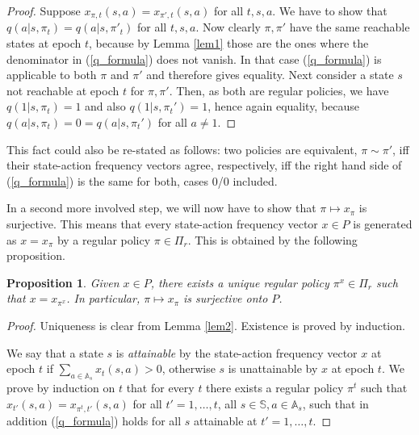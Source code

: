 \documentclass{article}
\newtheorem{proposition}[theorem]{Proposition}
\theoremstyle{definition}
\newcounter{step}[algorithm]
\numberwithin{equation}{section}
\begin{document}
{\begin{proof}
    Suppose $x_{\pi,t}(s,a) = x_{\pi',t}(s,a)$ for all $t,s,a$. We have to show that 
    $q(a|s,\pi_t) = q(a|s,\pi'_t)$ for all $t,s,a$. Now clearly $\pi,\pi'$ have the same reachable states
    at epoch $t$,
    because by Lemma \ref{lem1} those are the ones where the denominator in (\ref{q_formula}) does not vanish. In that case (\ref{q_formula}) is applicable to both $\pi$ and $\pi'$ and 
    therefore gives equality. Next consider a state $s$ not reachable at epoch $t$ for
    $\pi,\pi'$. Then, as both are regular policies, we have
    $q(1|s,\pi_t)=1$ and also $q(1|s,\pi_t')=1$, hence again equality, because
    $q(a|s,\pi_t) = 0 =  q(a|s,\pi_t')$ for all $a\not=1$.
\end{proof}

This fact could also be re-stated as follows: two policies are equivalent, $\pi \sim \pi'$,
iff their state-action frequency vectors agree, respectively, iff the right hand side of (\ref{q_formula}) is the same for both, cases 0/0 included. 






In a second more involved step, we will now have to show that
$\pi \mapsto x_\pi$ is surjective. This means that
every state-action frequency vector  $x \in P$ is  generated 
as $x=x_\pi$ by a regular policy $\pi\in \Pi_r$. 
This is obtained by the following proposition.



\begin{proposition}
\label{prop2}
%
Given $x \in  P$,  there exists a unique regular policy $\pi^x \in \Pi_r$ such that $x = x_{\pi^x}$. In particular, $\pi \mapsto x_\pi$ is surjective 
onto $P$.
\end{proposition}

\begin{proof}
Uniqueness is clear from Lemma \ref{lem2}. Existence is
proved by induction.

We say that a state $s$ is \textit{attainable} by the state-action frequency vector $x$
at epoch $t$ if $\sum_{a\in \mathbb{A}_s} x_t(s,a) > 0$, otherwise $s$ is unattainable by $x$ at epoch $t$. We prove
by induction on $t$ that for every $t$ there exists a regular policy $\pi^t$ such that $x_{t'}(s,a) = x_{\pi^t,t'}(s,a)$ for all $t'=1,\dots,  t$, all $s\in \mathbb{S},a\in \mathbb{A}_s$, such that in addition (\ref{q_formula}) holds for all  $s$ attainable at $t'=1,\dots,t$.


\end{proof}}
\end{document}
